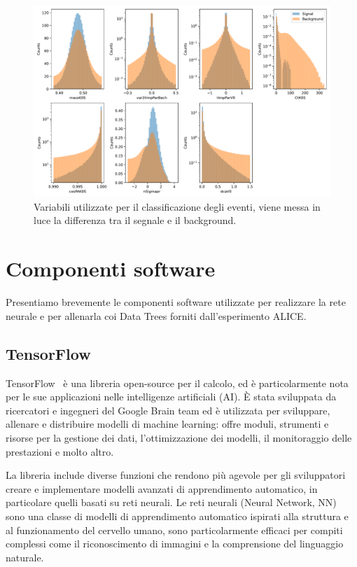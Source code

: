     \begin{figure}[p]
        \centering
        \includegraphics[width=1\linewidth]{res/fig/3-chapter/2-vars-histogram.pdf}
        \caption{Variabili utilizzate per il classificazione degli eventi, viene messa in luce la differenza tra il segnale e il background.}
        \label{fig:3-2-vars-histogram}
    \end{figure}

\clearpage

\section{Componenti software}
    Presentiamo brevemente le componenti software utilizzate per realizzare la rete neurale e per allenarla coi Data Trees forniti dall’esperimento ALICE.

    \subsection{TensorFlow}
        TensorFlow~\cite{TensorFlow} è una libreria open-source per il calcolo, ed è particolarmente nota per le sue applicazioni nelle intelligenze artificiali (AI). È stata sviluppata da ricercatori e ingegneri del Google Brain team ed è utilizzata per sviluppare, allenare e distribuire modelli di machine learning: offre moduli, strumenti e risorse per la gestione dei dati, l’ottimizzazione dei modelli, il monitoraggio delle prestazioni e molto altro.

        La libreria include diverse funzioni che rendono più agevole per gli sviluppatori creare e implementare modelli avanzati di apprendimento automatico, in particolare quelli basati su reti neurali. Le reti neurali (Neural Network, NN) sono una classe di modelli di apprendimento automatico ispirati alla struttura e al funzionamento del cervello umano, sono particolarmente efficaci per compiti complessi come il riconoscimento di immagini e la comprensione del linguaggio naturale.

